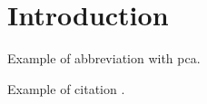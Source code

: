 \chapter{Introduction}

Example of abbreviation with \ac{pca}.

Example of citation \cite{luo_using_2004}.
